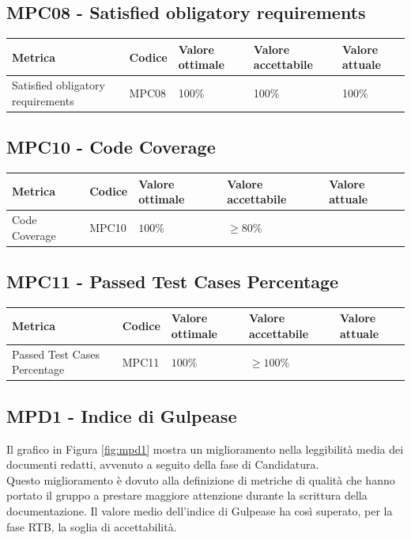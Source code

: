 \subsection{MPC08 - Satisfied obligatory requirements}
\label{s:mpc08}
\begin{table}[H]
    \centering
    \begin{tabularx}{\textwidth}{p{5.5cm}|X|l|l|l}
        \hline
		\textbf{Metrica} & \textbf{Codice} & \textbf{Valore ottimale} & \textbf{Valore accettabile}  & \textbf{Valore attuale} \\
        \hline
        Satisfied obligatory requirements  & MPC08 & 100\% & 100\% & 100\% \\
    \end{tabularx}
\end{table}


\subsection{MPC10 - Code Coverage}
\label{s:mpc10}
\begin{table}[H]
    \centering
    \begin{tabularx}{\textwidth}{p{5.5cm}|X|l|l|l}
        \hline
		\textbf{Metrica} & \textbf{Codice} & \textbf{Valore ottimale} & \textbf{Valore accettabile}  & \textbf{Valore attuale} \\
        \hline
        Code Coverage   & MPC10 & $100\%$   & $\ge 80\%$  & \\
    \end{tabularx}
\end{table}


\subsection{MPC11 - Passed Test Cases Percentage}
\label{s:mpc11}
\begin{table}[H]
    \centering
    \begin{tabularx}{\textwidth}{p{5.5cm}|X|l|l|l}
        \hline
		\textbf{Metrica} & \textbf{Codice} & \textbf{Valore ottimale} & \textbf{Valore accettabile}  & \textbf{Valore attuale} \\
        \hline
        Passed Test Cases Percentage    & MPC11 & $100\%$   & $\ge 100\%$ &  \\
    \end{tabularx}
\end{table}




\subsection{MPD1 - Indice di Gulpease}
\label{s:mpd1}
Il grafico in Figura \ref{fig:mpd1} mostra un miglioramento nella leggibilità media dei documenti redatti, avvenuto a seguito della fase di Candidatura.\\
Questo miglioramento è dovuto alla definizione di metriche di qualità che hanno portato il gruppo a prestare maggiore attenzione durante la scrittura della documentazione.
Il valore medio dell'indice di Gulpease ha così superato, per la fase RTB, la soglia di accettabilità.

